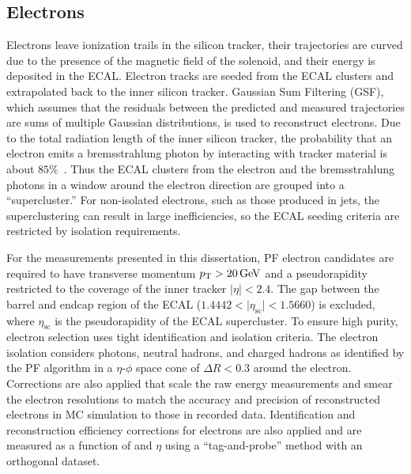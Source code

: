 \subsection{Electrons}
\label{PF_Reconstruction_Electrons}
Electrons leave ionization trails in the silicon tracker, their trajectories are curved due to the presence of the magnetic field of the solenoid, and their energy is deposited in the ECAL.
Electron tracks are seeded from the ECAL clusters and extrapolated back to the inner silicon tracker.
Gaussian Sum Filtering (GSF), which assumes that the residuals between the predicted and measured trajectories are sums of multiple Gaussian distributions, is used to reconstruct electrons.
Due to the total radiation length of the inner silicon tracker, the probability that an electron emits a bremsstrahlung photon by interacting with tracker material is about $85\%$~\cite{Sirunyan:2270046}.
Thus the ECAL clusters from the electron and the bremsstrahlung photons in a window around the electron direction are grouped into a ``supercluster.''
For non-isolated electrons, such as those produced in jets, the superclustering can result in large inefficiencies, so the ECAL seeding criteria are restricted by isolation requirements.

For the measurements presented in this dissertation, PF electron candidates are required to have transverse momentum $\pT > \SI{20}{\GeV}$ and a pseudorapidity restricted to the coverage of the inner tracker $\vert \eta \vert < 2.4$.
The gap between the barrel and endcap region of the ECAL ($1.4442 < \vert \eta_\mathrm{sc} \vert < 1.5660$) is excluded, where $\eta_\mathrm{sc}$ is the pseudorapidity of the ECAL supercluster.
To ensure high purity, electron selection uses tight identification and isolation criteria.
The electron isolation considers photons, neutral hadrons, and charged hadrons as identified by the PF algorithm in a $\eta$-$\phi$ space cone of $\Delta R < 0.3$ around the electron.
Corrections are also applied that scale the raw energy measurements and smear the electron resolutions to match the accuracy and precision of reconstructed electrons in MC simulation to those in recorded data.
Identification and reconstruction efficiency corrections for electrons are also applied and are measured as a function of \pT and $\eta$ using a ``tag-and-probe'' method with an orthogonal dataset.

